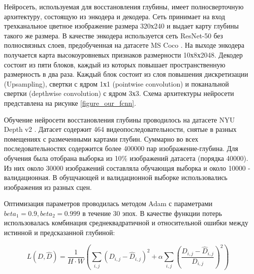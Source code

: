 \documentclass{mipt-thesis-ms}
\begin{document}
	Нейросеть, используемая для восстановления глубины, имеет полносверточную архитектуру, состоящую из энкодера и декодера. Сеть принимает на вход трехканальное цветное изображение размера 320х240 и выдает карту глубины такого же размера. В качестве энкодера используется сеть ResNet-50 \cite{he2016deep} без полносвязных слоев, предобученная на датасете MS Coco \cite{lin2014microsoft}. На выходе энкодера получается карта высокоуровневых признаков размерности 10х8х2048. Декодер состоит из пяти блоков, каждый из которых повышает пространственную размерность в два раза. Каждый блок состоит из слоя повышения дискретизации (Upsampling), свертки с ядром 1х1 (pointwise convolution) и поканальной свертки (depthwise convolution) с ядром 3х3. Схема архитектуры нейросети представлена на рисунке \ref{figure_our_fcnn}.
	
	Обучение нейросети восстановления глубины проводилось на датасете NYU Depth v2 \cite{silberman2012indoor}. Датасет содержит 464 видеопоследовательности, снятые в разных помещениях с размеченными картами глубин. Суммарно во всех последовательностях содержится более 400000 пар изображение-глубина. Для обучения была отобрана выборка из 10\% изображений датасета (порядка 40000). Из них около 30000 изображений составляла обучающая выборка и около 10000 - валидационная. В обущчающей и валидационной выборке использовались изображения из разных сцен.
	
	Оптимизация параметров проводилась методом Adam \cite{kingma2014adam} с параметрами $beta_1 = 0.9, beta_2 = 0.999$ в течение 30 эпох. В качестве функции потерь использовалась комбинация среднеквадратичной и относительной ошибки между истинной и предсказанной глубиной:
	
	\begin{equation}
		L(D, \widehat{D}) = \frac{1}{H \cdot W} (\sum\limits_{i,j} (D_{i,j} - \widehat{D}_{i,j})^2 + \alpha \sum\limits_{i,j} (\frac{D_{i,j} - \widehat{D}_{i,j}}{D_{i,j}})^2)
	\end{equation}
	
\end{document}
